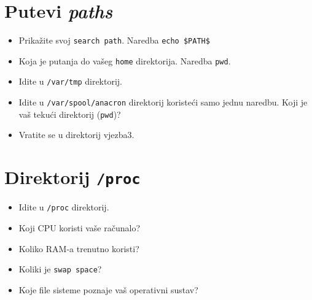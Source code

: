 \section{Putevi \textit{paths}}
\begin{itemize}
 \item Prikažite svoj \texttt{search path}. Naredba \texttt{echo \$PATH\$} 
 
 
\item Koja je putanja do vašeg \texttt{home} direktorija. Naredba \texttt{pwd}. 
\item Idite u \texttt{/var/tmp} direktorij.
\item Idite u \texttt{/var/spool/anacron} direktorij koristeći samo jednu naredbu. Koji je vaš tekući direktorij (\texttt{pwd})?
\item Vratite se u direktorij vjezba3.
\end{itemize}

\section{Direktorij \texttt{/proc} }
\begin{itemize}
 \item Idite u \texttt{/proc} direktorij.
\item Koji CPU koristi vaše računalo?
\item Koliko RAM-a trenutno koristi?
\item Koliki je \texttt{swap space}?
\item Koje file sisteme poznaje vaš operativni sustav?
\end{itemize}

\vfill

